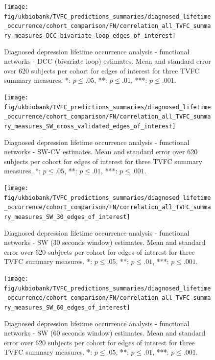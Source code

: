 \begin{figure}[h]
    \centering
    \texttt{[image: fig/ukbiobank/TVFC\_predictions\_summaries/diagnosed\_lifetime\_occurrence/cohort\_comparison/FN/correlation\_all\_TVFC\_summary\_measures\_DCC\_bivariate\_loop\_edges\_of\_interest]}
    \caption{
        Diagnosed depression lifetime occurrence analysis - functional networks - DCC (bivariate loop) estimates.
        Mean and standard error over 620 subjects per cohort for edges of interest for three TVFC summary measures.
        *: $p \leq .05$, **: $p \leq .01$, ***: $p \leq .001$.
    }\label{fig:ukb-results-dlo-fn-cohort-comparison-edges-of-interest-dcc-bl}
\end{figure}


\begin{figure}[h]
    \centering
    \texttt{[image: fig/ukbiobank/TVFC\_predictions\_summaries/diagnosed\_lifetime\_occurrence/cohort\_comparison/FN/correlation\_all\_TVFC\_summary\_measures\_SW\_cross\_validated\_edges\_of\_interest]}
    \caption{
        Diagnosed depression lifetime occurrence analysis - functional networks - SW-CV estimates.
        Mean and standard error over 620 subjects per cohort for edges of interest for three TVFC summary measures.
        *: $p \leq .05$, **: $p \leq .01$, ***: $p \leq .001$.
    }\label{fig:ukb-results-dlo-fn-cohort-comparison-edges-of-interest-sw-cv}
\end{figure}


\begin{figure}[h]
    \centering
    \texttt{[image: fig/ukbiobank/TVFC\_predictions\_summaries/diagnosed\_lifetime\_occurrence/cohort\_comparison/FN/correlation\_all\_TVFC\_summary\_measures\_SW\_30\_edges\_of\_interest]}
    \caption{
        Diagnosed depression lifetime occurrence analysis - functional networks - SW (30 seconds window) estimates.
        Mean and standard error over 620 subjects per cohort for edges of interest for three TVFC summary measures.
        *: $p \leq .05$, **: $p \leq .01$, ***: $p \leq .001$.
    }\label{fig:ukb-results-dlo-fn-cohort-comparison-edges-of-interest-sw-30}
\end{figure}


\begin{figure}[h]
    \centering
    \texttt{[image: fig/ukbiobank/TVFC\_predictions\_summaries/diagnosed\_lifetime\_occurrence/cohort\_comparison/FN/correlation\_all\_TVFC\_summary\_measures\_SW\_60\_edges\_of\_interest]}
    \caption{
        Diagnosed depression lifetime occurrence analysis - functional networks - SW (60 seconds window) estimates.
        Mean and standard error over 620 subjects per cohort for edges of interest for three TVFC summary measures.
        *: $p \leq .05$, **: $p \leq .01$, ***: $p \leq .001$.
    }\label{fig:ukb-results-dlo-fn-cohort-comparison-edges-of-interest-sw-60}
\end{figure}



